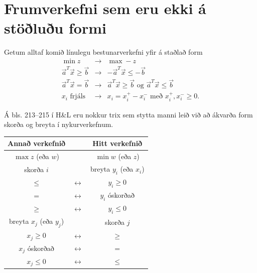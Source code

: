 \section{Frumverkefni sem eru ekki á stöðluðu formi}
Getum alltaf komið línulegu bestunarverkefni yfir á staðlað form 
{\renewcommand{\arraystretch}{1.5} \renewcommand{\tabcolsep}{0.2cm}
\begin{eqnarray*}
 \min z &\rightarrow& \max -z \\
 \vec{a}^T\vec{x}\geq \vec{b} &\rightarrow& -\vec{a}^T\vec{x}\leq-\vec{b} \\
 \vec{a}^T\vec{x}= \vec{b} &\rightarrow& \vec{a}^T\vec{x}\geq \vec{b} \textrm{ og } \vec{a}^T\vec{x}\leq \vec{b} \\
 x_i \textrm{ frjáls } &\rightarrow& x_i=x_i^+-x_i^- \textrm{ með } x_i^+,x_i^-\geq 0.
\end{eqnarray*}}
\begin{aths}
Á bls. 213--215 í H\&L eru nokkur trix sem stytta manni leið við að ákvarða form skorða og breyta í nykurverkefnum. 
\end{aths}
\begin{center}{\renewcommand{\arraystretch}{1.5} \renewcommand{\tabcolsep}{0.2cm}
\begin{tabular}{|ccc|}\hline 
Annað verkefnið && Hitt verkefnið \\ \hline 
$\max z$ (eða $w$) && $\min w$ (eða $z$) \\ \hline
skorða $i$ && breyta $y_i$ (eða $x_i$) \\
$\leq$ &$\longleftrightarrow$& $y_i\geq0$ \\ 
$=$ &$\longleftrightarrow$ & $y_i$ óskorðað \\
$\geq$ &$\longleftrightarrow$& $y_i\leq0$ \\ \hline 
breyta $x_j$ (eða $y_j$) && skorða $j$ \\  
$x_j\geq0$ &$\longleftrightarrow$ & $\geq$ \\ 
$x_j$ óskorðað &$\longleftrightarrow$ & $=$ \\
$x_j\leq0$ &$\longleftrightarrow$& $\leq$ \\ \hline 
\end{tabular}}
\end{center}

